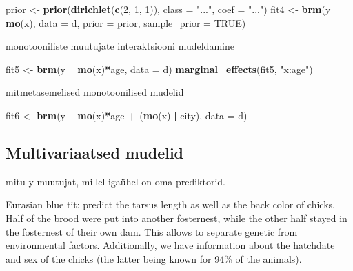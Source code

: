 \documentclass[]{book}
\newenvironment{Shaded}{\begin{snugshade}}{\end{snugshade}}
\newcommand{\KeywordTok}[1]{\textcolor[rgb]{0.13,0.29,0.53}{\textbf{#1}}}
\newcommand{\DataTypeTok}[1]{\textcolor[rgb]{0.13,0.29,0.53}{#1}}
\newcommand{\DecValTok}[1]{\textcolor[rgb]{0.00,0.00,0.81}{#1}}
\newcommand{\StringTok}[1]{\textcolor[rgb]{0.31,0.60,0.02}{#1}}
\newcommand{\OtherTok}[1]{\textcolor[rgb]{0.56,0.35,0.01}{#1}}
\newcommand{\OperatorTok}[1]{\textcolor[rgb]{0.81,0.36,0.00}{\textbf{#1}}}
\newcommand{\NormalTok}[1]{#1}
\begin{document}
\begin{Shaded}
\begin{Highlighting}[]
\NormalTok{prior <-}\StringTok{ }\KeywordTok{prior}\NormalTok{(}\KeywordTok{dirichlet}\NormalTok{(}\KeywordTok{c}\NormalTok{(}\DecValTok{2}\NormalTok{, }\DecValTok{1}\NormalTok{, }\DecValTok{1}\NormalTok{)), }\DataTypeTok{class =} \StringTok{"..."}\NormalTok{, }\DataTypeTok{coef =} \StringTok{"..."}\NormalTok{)}
\NormalTok{fit4 <-}\StringTok{ }\KeywordTok{brm}\NormalTok{(y }\OperatorTok{~}\StringTok{ }\KeywordTok{mo}\NormalTok{(x), }\DataTypeTok{data =}\NormalTok{ d,}
            \DataTypeTok{prior =}\NormalTok{ prior, }\DataTypeTok{sample_prior =} \OtherTok{TRUE}\NormalTok{)}
\end{Highlighting}
\end{Shaded}

monotooniliste muutujate interaktsiooni mudeldamine

\begin{Shaded}
\begin{Highlighting}[]
\NormalTok{fit5 <-}\StringTok{ }\KeywordTok{brm}\NormalTok{(y }\OperatorTok{~}\StringTok{ }\KeywordTok{mo}\NormalTok{(x)}\OperatorTok{*}\NormalTok{age, }\DataTypeTok{data =}\NormalTok{ d)}
\KeywordTok{marginal_effects}\NormalTok{(fit5, }\StringTok{"x:age"}\NormalTok{)}
\end{Highlighting}
\end{Shaded}

mitmetasemelised monotoonilised mudelid

\begin{Shaded}
\begin{Highlighting}[]
\NormalTok{fit6 <-}\StringTok{ }\KeywordTok{brm}\NormalTok{(y }\OperatorTok{~}\StringTok{ }\KeywordTok{mo}\NormalTok{(x)}\OperatorTok{*}\NormalTok{age }\OperatorTok{+}\StringTok{ }\NormalTok{(}\KeywordTok{mo}\NormalTok{(x) }\OperatorTok{|}\StringTok{ }\NormalTok{city), }\DataTypeTok{data =}\NormalTok{ d)}
\end{Highlighting}
\end{Shaded}

\subsection{Multivariaatsed mudelid}\label{multivariaatsed-mudelid}

mitu y muutujat, millel igaühel on oma prediktorid.

Eurasian blue tit: predict the tarsus length as well as the back color
of chicks. Half of the brood were put into another fosternest, while the
other half stayed in the fosternest of their own dam. This allows to
separate genetic from environmental factors. Additionally, we have
information about the hatchdate and sex of the chicks (the latter being
known for 94\% of the animals).
\end{document}
